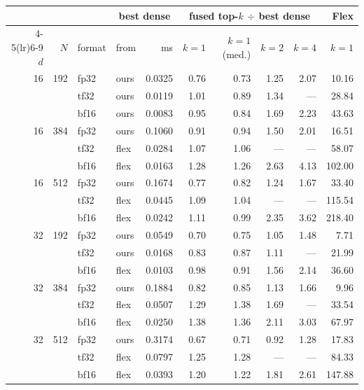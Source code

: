 \begin{tabular}{rrl lr rrrr r}
\toprule
& & & \multicolumn{2}{c}{\textbf{best dense}} & \multicolumn{4}{c}{\textbf{fused top-$k$ $\div$ best dense}} & \textbf{Flex} \\
\cmidrule(lr){4-5}\cmidrule(lr){6-9}
$d$ & $N$ & format & from & ms & $k{=}1$ & $k{=}1$ (med.) & $k{=}2$ & $k{=}4$ & $k{=}1$ \\
\midrule
16 & 192 & fp32 & ours & 0.0325 & 0.76 & 0.73 & 1.25 & 2.07 & 10.16 \\
 &  & tf32 & ours & 0.0119 & 1.01 & 0.89 & 1.34 & --- & 28.84 \\
 &  & bf16 & ours & 0.0083 & 0.95 & 0.84 & 1.69 & 2.23 & 43.63 \\
16 & 384 & fp32 & ours & 0.1060 & 0.91 & 0.94 & 1.50 & 2.01 & 16.51 \\
 &  & tf32 & flex & 0.0284 & 1.07 & 1.06 & --- & --- & 58.07 \\
 &  & bf16 & flex & 0.0163 & 1.28 & 1.26 & 2.63 & 4.13 & 102.00 \\
16 & 512 & fp32 & ours & 0.1674 & 0.77 & 0.82 & 1.24 & 1.67 & 33.40 \\
 &  & tf32 & flex & 0.0445 & 1.09 & 1.04 & --- & --- & 115.54 \\
 &  & bf16 & flex & 0.0242 & 1.11 & 0.99 & 2.35 & 3.62 & 218.40 \\
\midrule
32 & 192 & fp32 & ours & 0.0549 & 0.70 & 0.75 & 1.05 & 1.48 & 7.71 \\
 &  & tf32 & ours & 0.0168 & 0.83 & 0.87 & 1.11 & --- & 21.99 \\
 &  & bf16 & flex & 0.0103 & 0.98 & 0.91 & 1.56 & 2.14 & 36.60 \\
32 & 384 & fp32 & ours & 0.1884 & 0.82 & 0.85 & 1.13 & 1.66 & 9.96 \\
 &  & tf32 & flex & 0.0507 & 1.29 & 1.38 & 1.69 & --- & 33.54 \\
 &  & bf16 & flex & 0.0250 & 1.38 & 1.36 & 2.11 & 3.03 & 67.97 \\
32 & 512 & fp32 & ours & 0.3174 & 0.67 & 0.71 & 0.92 & 1.28 & 17.83 \\
 &  & tf32 & flex & 0.0797 & 1.25 & 1.28 & --- & --- & 84.33 \\
 &  & bf16 & flex & 0.0393 & 1.20 & 1.22 & 1.81 & 2.61 & 147.88 \\
\bottomrule
\end{tabular}%
